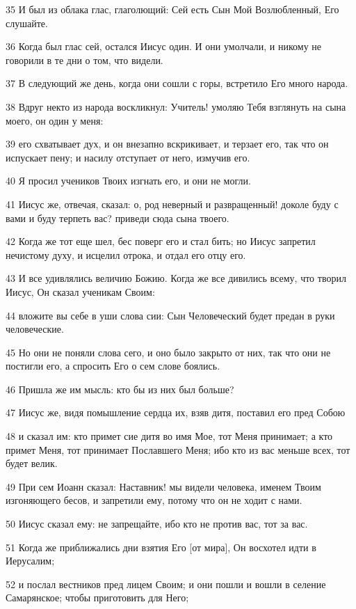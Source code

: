 \par 35 И был из облака глас, глаголющий: Сей есть Сын Мой Возлюбленный, Его слушайте.
\par 36 Когда был глас сей, остался Иисус один. И они умолчали, и никому не говорили в те дни о том, что видели.
\par 37 В следующий же день, когда они сошли с горы, встретило Его много народа.
\par 38 Вдруг некто из народа воскликнул: Учитель! умоляю Тебя взглянуть на сына моего, он один у меня:
\par 39 его схватывает дух, и он внезапно вскрикивает, и терзает его, так что он испускает пену; и насилу отступает от него, измучив его.
\par 40 Я просил учеников Твоих изгнать его, и они не могли.
\par 41 Иисус же, отвечая, сказал: о, род неверный и развращенный! доколе буду с вами и буду терпеть вас? приведи сюда сына твоего.
\par 42 Когда же тот еще шел, бес поверг его и стал бить; но Иисус запретил нечистому духу, и исцелил отрока, и отдал его отцу его.
\par 43 И все удивлялись величию Божию. Когда же все дивились всему, что творил Иисус, Он сказал ученикам Своим:
\par 44 вложите вы себе в уши слова сии: Сын Человеческий будет предан в руки человеческие.
\par 45 Но они не поняли слова сего, и оно было закрыто от них, так что они не постигли его, а спросить Его о сем слове боялись.
\par 46 Пришла же им мысль: кто бы из них был больше?
\par 47 Иисус же, видя помышление сердца их, взяв дитя, поставил его пред Собою
\par 48 и сказал им: кто примет сие дитя во имя Мое, тот Меня принимает; а кто примет Меня, тот принимает Пославшего Меня; ибо кто из вас меньше всех, тот будет велик.
\par 49 При сем Иоанн сказал: Наставник! мы видели человека, именем Твоим изгоняющего бесов, и запретили ему, потому что он не ходит с нами.
\par 50 Иисус сказал ему: не запрещайте, ибо кто не против вас, тот за вас.
\par 51 Когда же приближались дни взятия Его [от мира], Он восхотел идти в Иерусалим;
\par 52 и послал вестников пред лицем Своим; и они пошли и вошли в селение Самарянское; чтобы приготовить для Него;
